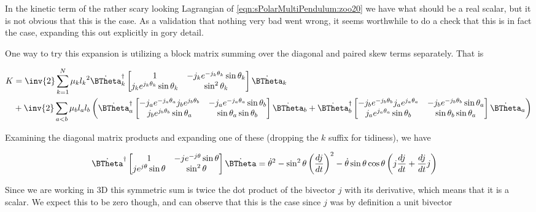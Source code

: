 In the kinetic term of the rather scary looking Lagrangian of \ref{eqn:sPolarMultiPendulum:zoo20} we have what should be a real scalar, but it is not obvious that this is the case.  As a validation that nothing very bad went wrong, it seems worthwhile to do a check that this is in fact the case, expanding this out explicitly in gory detail.

One way to try this expansion is utilizing a block matrix summing over the diagonal and paired skew terms separately.  That is

\begin{align*}
K &=
\inv{2}
\sum_{k=1}^N
\mu_k
{l_k}^2
{\dot{\BTheta}_k}^\dagger
\begin{bmatrix}
1 & - j_k e^{-j_k \theta_k} \sin\theta_k \\
j_k e^{j_k \theta_k} \sin\theta_k & \sin^2\theta_k 
\end{bmatrix}
\dot{\BTheta}_k \\
&+
\inv{2}
\sum_{a<b}
\mu_b
l_a l_b
\left(
{\dot{\BTheta}_a}^\dagger
\begin{bmatrix}
- j_a e^{-j_a \theta_a} j_b e^{j_b\theta_b} & - j_a e^{-j_a \theta_a} \sin\theta_b \\
j_b e^{j_b \theta_b} \sin\theta_a & \sin\theta_a \sin\theta_b
\end{bmatrix}
\dot{\BTheta}_b 
+
{\dot{\BTheta}_b}^\dagger
\begin{bmatrix}
- j_b e^{-j_b \theta_b} j_a e^{j_a\theta_a} & - j_b e^{-j_b \theta_b} \sin\theta_a \\
j_a e^{j_a \theta_a} \sin\theta_b & \sin\theta_b \sin\theta_a
\end{bmatrix}
\dot{\BTheta}_a
\right)
\end{align*}

Examining the diagonal matrix products and expanding one of these (dropping the $k$ suffix for tidiness), we have

\begin{align}\label{eqn:sPolarMultiPendulum:moo1}
{\dot{\BTheta}}^\dagger
\begin{bmatrix}
1 & - j e^{-j \theta} \sin\theta \\
j e^{j \theta} \sin\theta & \sin^2\theta 
\end{bmatrix}
\dot{\BTheta} 
&=
\dot{\theta}^2 -\sin^2\theta \left(\frac{dj}{dt}\right)^2 - \dot{\theta} \sin\theta\cos\theta \left( j \frac{dj}{dt} + \frac{dj}{dt} j \right)
\end{align}

Since we are working in 3D this symmetric sum is twice the dot product of the bivector $j$ with its derivative, which means that it is a scalar.  We expect this to be zero though, and can observe that this is the case since $j$ was by definition a unit bivector

